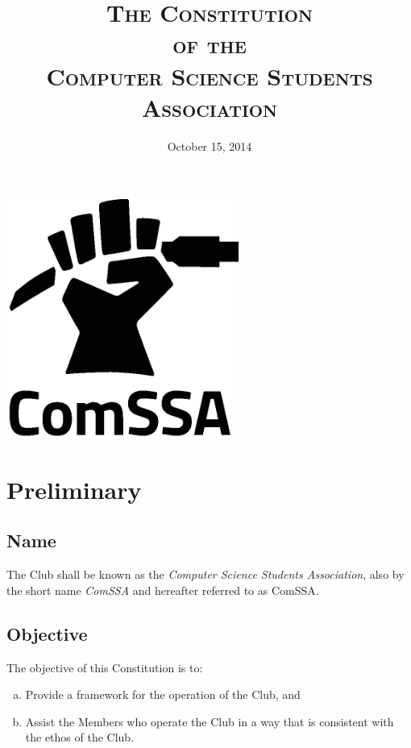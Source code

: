 \documentclass[a4paper,12pt]{article}
\title{\scshape
	The Constitution\\
	of the\\
	Computer Science Students Association
}
\date{October 15, 2014}
\author{} %
\begin{document}
\maketitle

\vspace{1in}

\begin{center}
	\includegraphics[width=3in]{logo/delan/comssalogo_crop_black.eps}
\end{center}

\newpage


\section{Preliminary}

\subsection{Name}

The Club shall be known as the \textit{Computer Science Students Association}, also by the short name \textit{ComSSA} and hereafter referred to as ComSSA.

\subsection{Objective}

The objective of this Constitution is to:

\begin{enumerate}[a)]
	\item Provide a framework for the operation of the Club, and
	\item Assist the Members who operate the Club in a way that is consistent with the ethos of the Club.
\end{enumerate}
\end{document}
